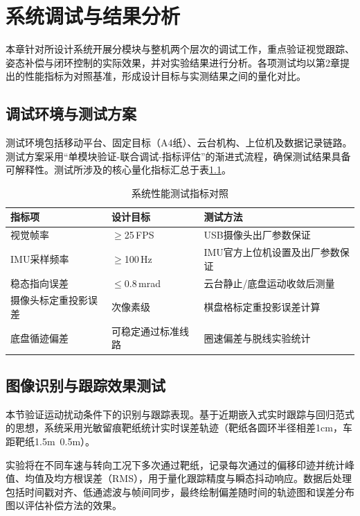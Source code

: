 \chapter{系统调试与结果分析}

本章针对所设计系统开展分模块与整机两个层次的调试工作，重点验证视觉跟踪、姿态补偿与闭环控制的实际效果，并对实验结果进行分析。各项测试均以第2章提出的性能指标为对照基准，形成设计目标与实测结果之间的量化对比。

\section{调试环境与测试方案}

测试环境包括移动平台、固定目标（A4纸）、云台机构、上位机及数据记录链路。测试方案采用``单模块验证-联合调试-指标评估''的渐进式流程，确保测试结果具备可解释性。测试所涉及的核心量化指标汇总于表\ref{tab:test_indicators}。

\begin{table}[htbp]
\centering
\caption{系统性能测试指标对照}
\label{tab:test_indicators}
\begin{tabular}{lll}
\hline
指标项 & 设计目标 & 测试方法 \\
\hline
视觉帧率 & $\geq$25\,FPS & USB摄像头出厂参数保证 \\
IMU采样频率 & $\geq$100\,Hz & IMU官方上位机设置及出厂参数保证 \\
稳态指向误差 & $\leq$0.8\,mrad & 云台静止/底盘运动收敛后测量 \\
摄像头标定重投影误差 & 次像素级 & 棋盘格标定重投影误差计算 \\
底盘循迹偏差 & 可稳定通过标准线路 & 圈速偏差与脱线实验统计 \\
\hline
\end{tabular}
\end{table}

\section{图像识别与跟踪效果测试}

本节验证运动扰动条件下的识别与跟踪表现。基于近期嵌入式实时跟踪与回归范式\cite{zhang2024temporalcorrelationmeetsembedding}的思想，系统采用光敏留痕靶纸统计实时误差轨迹（靶纸各圆环半径相差1cm，车距靶纸1.5m~0.5m）。

实验将在不同车速与转向工况下多次通过靶纸，记录每次通过的偏移印迹并统计峰值、均值及均方根误差（RMS），用于量化跟踪精度与瞬态抖动响应。数据后处理包括时间戳对齐、低通滤波与帧间同步，最终绘制偏差随时间的轨迹图和误差分布图以评估补偿方法的效果。

